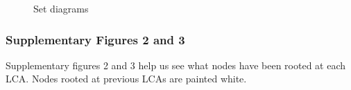 \begin{figure}
\newline{}\newline{}\caption{Set diagrams}\label{fig:unnamed-chunk-13}
\end{figure}

\hypertarget{supplementary-figures-2-and-3}{%
\subsubsection{Supplementary Figures 2 and
3}\label{supplementary-figures-2-and-3}}

Supplementary figures 2 and 3 help us see what nodes have been rooted at
each LCA. Nodes rooted at previous LCAs are painted white.

